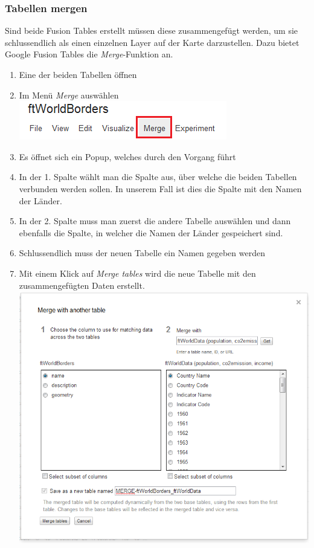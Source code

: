 \subsubsection{Tabellen mergen}
Sind beide Fusion Tables erstellt müssen diese zusammengefügt werden, um sie schlussendlich als einen einzelnen Layer auf der Karte darzustellen. Dazu bietet Google Fusion Tables die \emph{Merge}-Funktion an. 

\begin{enumerate}
\item Eine der beiden Tabellen öffnen
\item Im Menü \emph{Merge} auswählen \\ \includegraphics{images/usecase1-worlddata/documentation/worlddata-merge1.png}
\item Es öffnet sich ein Popup, welches durch den Vorgang führt
\item In der 1. Spalte wählt man die Spalte aus, über welche die beiden Tabellen verbunden werden sollen. In unserem Fall ist dies die Spalte mit den Namen der Länder.
\item In der 2. Spalte muss man zuerst die andere Tabelle auswählen und dann ebenfalls die Spalte, in welcher die Namen der Länder gespeichert sind.
\item Schlussendlich muss der neuen Tabelle ein Namen gegeben werden
\item Mit einem Klick auf \emph{Merge tables} wird die neue Tabelle mit den zusammengefügten Daten erstellt. \\ \includegraphics[scale=0.8]{images/usecase1-worlddata/documentation/worlddata-merge2.png}
\end{enumerate}


